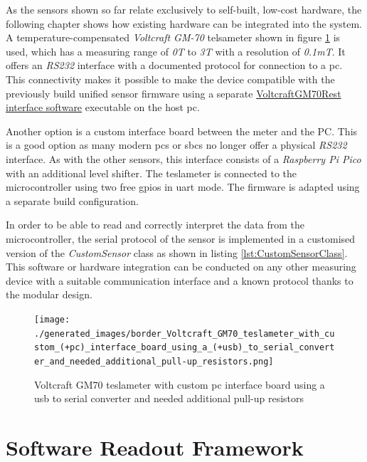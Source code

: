As the sensors shown so far relate exclusively to self-built, low-cost
hardware, the following chapter shows how existing hardware can be
integrated into the system. A temperature-compensated \emph{Voltcraft
GM-70} telsameter shown in figure
\ref{Voltcraft_GM70_teslameter_with_custom_(+pc)_interface_board_using_a_(+usb)_to_serial_converter_and_needed_additional_pull-up_resistors.png}
is used, which has a measuring range of \emph{0T} to \emph{3T} with a
resolution of \emph{0.1mT}. It offers an \emph{RS232} interface with a
documented protocol for connection to a \gls{pc}. This connectivity
makes it possible to make the device compatible with the previously
build unified sensor firmware using a separate
\href{https://github.com/RBEGamer/VoltcraftGM70Rest}{VoltcraftGM70Rest interface software}
executable on the host \gls{pc}.

\newpage

Another option is a custom interface board between the meter and the PC.
This is a good option as many modern \gls{pc}s or \gls{sbc}s no longer
offer a physical \emph{RS232} interface. As with the other sensors, this
interface consists of a \emph{Raspberry Pi Pico} with an additional
level shifter. The teslameter is connected to the microcontroller using
two free \gls{gpio}s in \gls{uart} mode. The firmware is adapted using a
separate build configuration.

In order to be able to read and correctly interpret the data from the
microcontroller, the serial protocol of the sensor is implemented in a
customised version of the \emph{CustomSensor} class as shown in listing
\ref{lst:CustomSensorClass}. This software or hardware integration can
be conducted on any other measuring device with a suitable communication
interface and a known protocol thanks to the modular design.

\begin{figure}
\centering
\texttt{[image: ./generated\_images/border\_Voltcraft\_GM70\_teslameter\_with\_custom\_(+pc)\_interface\_board\_using\_a\_(+usb)\_to\_serial\_converter\_and\_needed\_additional\_pull-up\_resistors.png]}
\caption{Voltcraft GM70 teslameter with custom \gls{pc} interface board
using a \gls{usb} to serial converter and needed additional pull-up
resistors
\label{Voltcraft_GM70_teslameter_with_custom_(+pc)_interface_board_using_a_(+usb)_to_serial_converter_and_needed_additional_pull-up_resistors.png}}
\end{figure}

\hypertarget{software-readout-framework}{%
\chapter{Software Readout Framework}\label{software-readout-framework}}

